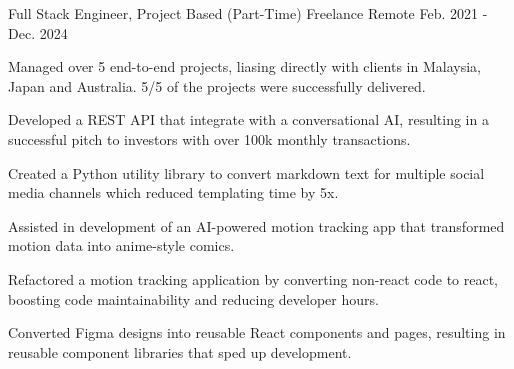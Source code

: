 

\begin{cventries}

  \cventry
    {Full Stack Engineer, Project Based (Part-Time)} %
    {Freelance} %
    {Remote} %
    {Feb. 2021 - Dec. 2024} %
    {
      \begin{cvitems} %
        \item {Managed over 5 end-to-end projects, liasing directly with clients in Malaysia, Japan and Australia. 5/5 of the projects were successfully delivered.}
        \item {Developed a REST API that integrate with a conversational AI, resulting in a successful pitch to investors with over 100k monthly transactions.}
        \item {Created a Python utility library to convert markdown text for multiple social media channels which reduced templating time by 5x.}
        \item {Assisted in development of an AI-powered motion tracking app that transformed motion data into anime-style comics.}
        \item {Refactored a motion tracking application by converting non-react code to react, boosting code maintainability and reducing developer hours.}
        \item {Converted Figma designs into reusable React components and pages, resulting in reusable component libraries that sped up development.}
      \end{cvitems}
    }


\end{cventries}
